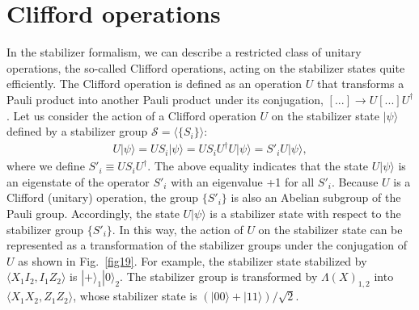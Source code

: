 \section{Clifford operations}
In the stabilizer formalism, 
we can describe a restricted class of unitary operations,
the so-called Clifford operations,
acting on the stabilizer states quite efficiently.
The Clifford operation is defined as an operation $U$ 
that transforms a Pauli product into another Pauli product under its conjugation, 
$[...] \rightarrow U[...]U^{\dag}$.
Let us consider the action of a Clifford operation $U$ on the stabilizer state $|\psi \rangle$ defined by a stabilizer group 
$\mathcal{S}=\langle \{S_i\}  \rangle$:
\begin{eqnarray}
U | \psi \rangle = US_i |\psi \rangle  = U S_i U^{\dag}U  | \psi \rangle  = S'_i  U| \psi \rangle,
\end{eqnarray}
where we define $S'_i \equiv U S_i U^{\dag} $.
The above equality indicates that the state $U | \psi \rangle $ is an eigenstate of the operator $S'_i$ with an eigenvalue +1 for all $S'_i$.
Because $U$ is a Clifford (unitary) operation, the group $\{ S'_i \}$ is also an Abelian subgroup of the Pauli group.
Accordingly, the state $U | \psi \rangle $ is a stabilizer state with respect to the stabilizer group $\{ S'_i\}$.
In this way, the action of $U$ on the stabilizer state can be represented as a transformation of the stabilizer groups under the conjugation of $U$ as shown in Fig.~\ref{fig19}.
For example, the stabilizer state stabilized by $\langle X_1I_2, I_1Z_2 \rangle$ is $|+\rangle_1 |0\rangle_2$.
The stabilizer group is transformed by $\Lambda (X)_{1,2}$ into $\langle X_1X_2, Z_1Z_2 \rangle$, whose stabilizer state is $(|00\rangle  + |11\rangle)/\sqrt{2}$.


